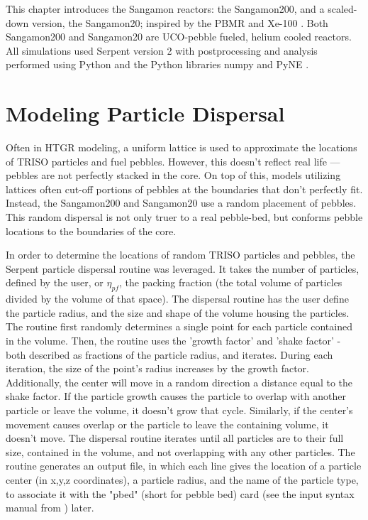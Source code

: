 This chapter introduces the Sangamon reactors:  the Sangamon200, and a scaled-down version, the Sangamon20; inspired by the PBMR \cite{venter_pbmr_2005, noauthor_pebble_2017} and Xe-100 \cite{harlan_ans_2017, harlan_x-energy_2018}.  Both Sangamon200 and Sangamon20 are UCO-pebble fueled, helium cooled reactors.  All simulations used Serpent version 2 \cite{leppanenjaakko_serpent_2015} with postprocessing and analysis performed using Python \cite{van_rossum_python_nodate} and the Python libraries numpy \cite{harris_array_2020} and PyNE \cite{scopatz_pyne:_2012}.  

\section{Modeling Particle Dispersal}

Often in HTGR modeling, a uniform lattice is used to approximate the locations of TRISO particles and fuel pebbles.  However, this doesn't reflect real life --- pebbles are not perfectly stacked in the core.  On top of this, models utilizing lattices often cut-off portions of pebbles at the boundaries that don't perfectly fit.  Instead, the Sangamon200 and Sangamon20 use a random placement of pebbles.  This random dispersal is not only truer to a real pebble-bed, but conforms pebble locations to the boundaries of the core.

In order to determine the locations of random TRISO particles and pebbles, the Serpent particle dispersal routine was leveraged.  It takes the number of particles, defined by the user, or $\eta_{pf}$, the packing fraction (the total volume of particles divided by the volume of that space).  The dispersal routine has the user define the particle radius, and the size and shape of the volume housing the particles.  The routine first randomly determines a single point for each particle contained in the volume.  Then, the routine uses the 'growth factor' and 'shake factor' - both described as fractions of the particle radius, and iterates.  During each iteration, the size of the point's radius increases by the growth factor.  Additionally, the center will move in a random direction a distance equal to the shake factor.  If the particle growth causes the particle to overlap with another particle or leave the volume, it doesn't grow that cycle.  Similarly, if the center's movement causes overlap or the particle to leave the containing volume, it doesn't move.  The dispersal routine iterates until all particles are to their full size, contained in the volume, and not overlapping with any other particles.  The routine generates an output file, in which each line gives the location of a particle center (in x,y,z coordinates), a particle radius, and the name of the particle type, to associate it with the "pbed" (short for pebble bed) card (see the input syntax manual from \cite{leppanenjaakko_serpent_2015}) later.

